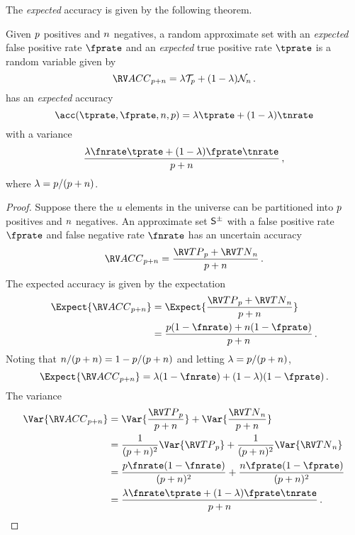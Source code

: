 \documentclass[ ../main.tex]{subfiles}
\begin{document}
The \emph{expected} accuracy is given by the following theorem.
\begin{theorem}
	\label{thm:approx_expected_accuracy}
	Given $p$ positives and $n$ negatives, a random approximate set with an 
	\emph{expected} false positive rate $\fprate$ and an \emph{expected} true 
	positive rate $\tprate$ is a random variable given by
	\begin{equation}
		\ACC_{\p + \n} = \lambda \TPR_\p + (1 - \lambda) \TNR_\n\,.
	\end{equation}	
	has an \emph{expected} accuracy
	\begin{equation}
	\label{eq:approx_expected_accuracy}
	\acc(\tprate,\fprate,\n,\p) = \lambda \tprate + (1-\lambda) \tnrate
	\end{equation}
	with a variance
	\begin{equation}
	\frac{\lambda \fnrate \tprate + (1 - \lambda)\fprate 
		\tnrate}{\p+\n}\,,   
	\end{equation}
	where $\lambda = p / (p + n)$.
\end{theorem}
\begin{proof}
	Suppose there the $u$ elements in the universe can be partitioned into $p$ 
	positives and $n$ negatives. An approximate set $\ASet{S}$ with a false 
	positive rate $\fprate$ and false negative rate $\fnrate$ has an uncertain 
	accuracy
	\begin{equation}
	\ACC_{\p + \n} = \frac{\TP_\p + \TN_\n}{\p + \n}\,.
	\end{equation}
	The expected accuracy is given by the expectation
	\begin{align}
	\Expect{\ACC_{\p + \n}}
	&= \Expect{\frac{\TP_\p + \TN_\n}{\p + \n}}\\
	&= \frac{\p (1 - \fnrate) + \n (1 - \fprate)}{\p + \n}\,.
	\end{align}
	Noting that $n/(p+n) = 1 - p/(p+n)$ and letting $\lambda = p/(p + 
	n)$,
	\begin{equation}
	\Expect{\ACC_{\p + \n}} = \lambda (1 - \fnrate) + (1 - \lambda) (1 - 
	\fprate)\,.
	\end{equation}
	The variance
	\begin{align}
	\Var{\ACC_{\p + \n}}
	&= \Var{\frac{\TP_\p}{\p + \n}} + \Var{\frac{\TN_\n}{\p + \n}}\\
	&= \frac{1}{(\p + \n)^2}\Var{\TP_\p} + \frac{1}{(\p + \n)^2}\Var{\TN_\n}\\
	&= \frac{\p \fnrate (1 - \fnrate)}{(\p + \n)^2} + \frac{\n \fprate (1 - 
	\fprate)}{(\p + \n)^2}\\
	&= \frac{\lambda \fnrate \tprate + (1 - \lambda)\fprate 
		\tnrate}{\p+\n}\,.
	\end{align}
\end{proof}
\end{document}
